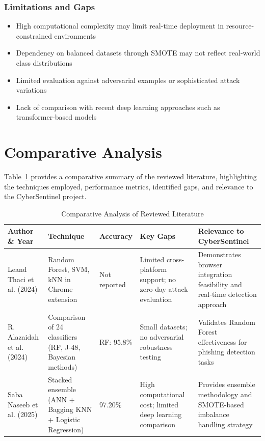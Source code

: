 	\subsubsection{Limitations and Gaps}
	\begin{itemize}
		\item High computational complexity may limit real-time deployment in resource-constrained environments
		\item Dependency on balanced datasets through SMOTE may not reflect real-world class distributions
		\item Limited evaluation against adversarial examples or sophisticated attack variations
		\item Lack of comparison with recent deep learning approaches such as transformer-based models
	\end{itemize}
	
\section{Comparative Analysis}
	
	Table~\ref{tab:comparative_analysis} provides a comparative summary of the reviewed literature, highlighting the techniques employed, performance metrics, identified gaps, and relevance to the CyberSentinel project.
	
	\begin{table}[h!]
		\centering
		\caption{Comparative Analysis of Reviewed Literature}
		\label{tab:comparative_analysis}
		\begin{tabular}{|p{3cm}|p{3cm}|p{2cm}|p{3.5cm}|p{3.5cm}|}
			\hline
			\textbf{Author \& Year} & \textbf{Technique} & \textbf{Accuracy} & \textbf{Key Gaps} & \textbf{Relevance to CyberSentinel} \\
			\hline
			Leand Thaci et al. (2024) & Random Forest, SVM, kNN in Chrome extension & Not reported & Limited cross-platform support; no zero-day attack evaluation & Demonstrates browser integration feasibility and real-time detection approach \\
			\hline
			R. Alazaidah et al. (2024) & Comparison of 24 classifiers (RF, J-48, Bayesian methods) & RF: 95.8\% & Small datasets; no adversarial robustness testing & Validates Random Forest effectiveness for phishing detection tasks \\
			\hline
			Saba Naseeb et al. (2025) & Stacked ensemble (ANN + Bagging KNN + Logistic Regression) & 97.20\% & High computational cost; limited deep learning comparison & Provides ensemble methodology and SMOTE-based imbalance handling strategy \\
			\hline
		\end{tabular}
	\end{table}
	
